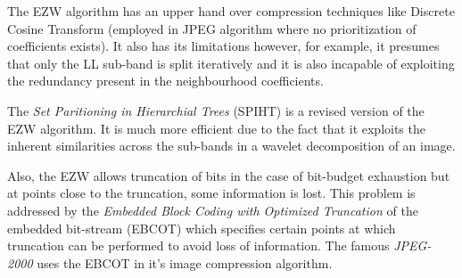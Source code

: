 \documentclass[./A14_Report.tex]{subfiles}
\begin{document}
\par

The EZW algorithm has an upper hand over compression techniques like Discrete
Cosine Transform (employed in JPEG algorithm where no prioritization of
coefficients exists). It also has its limitations however, for example, it
presumes that only the LL sub-band is split iteratively and it is also
incapable of exploiting the redundancy present in the neighbourhood
coefficients.

The \textit{Set Paritioning in Hierarchial Trees} (SPIHT) is a revised version
of the EZW algorithm. It is much more efficient due to the fact that it
exploits the inherent similarities across the sub-bands in a wavelet
decomposition of an image. \cite{sayood_datac}

\par

Also, the EZW allows truncation of bits in the case of bit-budget exhaustion
but at points close to the truncation, some information is lost. This problem
is addressed by the \textit{Embedded Block Coding with Optimized Truncation} of
the embedded bit-stream (EBCOT) which specifies certain points at which
truncation can be performed to avoid loss of information. The famous
\textit{JPEG-2000} uses the EBCOT in it's image compression algorithm. \cite{sayood_datac}
\end{document}
